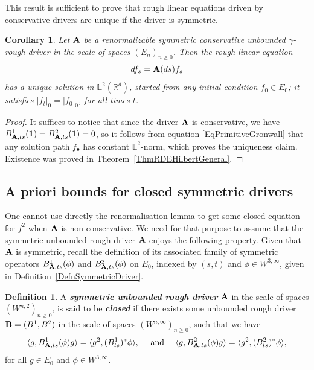 \documentclass[11pt,a4paper]{amsart}
\newcommand{\RR}{\mathbb{R}}  \newcommand{\CC}{\mathbb{C}}  \newcommand{\LL}{\mathbb{L}}  \newcommand{\WW}{\mathbb{W}}
\renewcommand{\geq}{\geqslant}
\theoremstyle{plain}%
\newtheorem{corollary}[theorem]{Corollary}
\theoremstyle{definition}
\newtheorem{definition}[theorem]{Definition}
\theoremstyle{remark}
\numberwithin{equation}{section} %
\begin{document}
\bigskip

This result is sufficient to prove that rough linear equations driven by conservative drivers are unique if the driver is symmetric. 

\begin{corollary}
\label{CorClosedSymmCons}
Let $\bf A$ be a renormalizable symmetric conservative unbounded $\gamma$-rough driver in the scale of spaces $(E_n)_{n\geq 0}$. Then the rough linear equation
$$
df_s = {\bf A}(ds)f_s
$$
has a unique solution in $\LL^2(\RR^d)$, started from any initial condition $f_0\in E_0$; it satisfies $|f_t|_0 = |f_0|_0$, for all times $t$.
\end{corollary}

\smallskip

\begin{proof}
It suffices to notice that since the driver $\bf A$ is conservative, we have $B^1_{{\bf A},ts}({\bf 1}) = B^2_{{\bf A},ts}({\bf 1}) = 0$, so it follows from equation \eqref{EqPrimitiveGronwall} that any solution path $f_\bullet$ has constant $\LL^2$-norm, which proves the uniqueness claim. Existence was proved in Theorem~\ref{ThmRDEHilbertGeneral}.
\end{proof}


\bigskip


\subsection{A priori bounds for closed symmetric drivers}
\label{SymmetricDrivers}

One cannot use directly the renormalisation lemma to get some closed equation for $f^2$ when $\bf A$ is non-conservative. We need for that purpose to assume that the symmetric unbounded rough driver $\bf A$ enjoys the following property. Given that $\bf A$ is symmetric, recall the definition of its associated family of symmetric operators $B^1_{{\bf A},ts}(\phi)$ and $B^2_{{\bf A},ts}(\phi)$ on $E_0$, indexed by $(s,t)$ and $\phi\in W^{3,\infty}$, given in Definition~\ref{DefnSymmetricDriver}.

\begin{definition}
\label{DefnClosedDriver}
A \emph{\textbf{symmetric unbounded rough driver}} $\bf A$ in the scale of spaces $(W^{n,2})_{n\geq 0}$, is said to be \emph{\textbf{closed}} if there exists some unbounded rough driver ${\bf B}=(B^1,B^2)$ in the scale of spaces $(W^{n,\infty})_{n\geq 0}$, such that we have  
$$
\langle g,B^1_{{\bf A},ts}(\phi)g \rangle = \langle g^2,(B^1_{ts})^*\phi\rangle, \quad \textrm{  and  } \quad \langle g,B^2_{{\bf A},ts}(\phi)g\rangle = \langle g^2,(B^2_{ts})^*\phi\rangle,
$$
for all $g\in E_0$ and $\phi\in W^{3,\infty}$. 
\end{definition}
\end{document}
